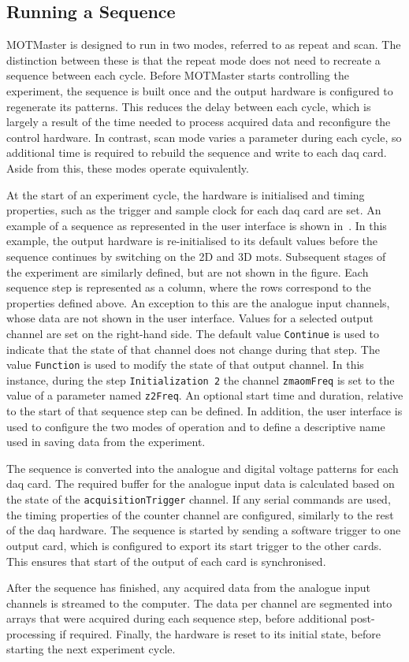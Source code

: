 \subsection{Running a Sequence}
MOTMaster is designed to run in two modes, referred to as repeat and scan.
The distinction between these is that the repeat mode does not need to
recreate a sequence between each cycle. Before MOTMaster starts controlling
the experiment, the sequence is built once and the output hardware is configured
to regenerate its patterns. This reduces the delay between
each cycle, which is largely a result of the time needed to process acquired
data and reconfigure the control hardware. In contrast, scan mode varies a
parameter during each cycle, so additional time is required to rebuild the
sequence and write to each \ac{daq} card. Aside from this, these modes
operate equivalently. \par\noindent
At the start of an experiment cycle, the hardware is
initialised and timing properties, such as the trigger and sample clock for
each \ac{daq} card are set. An example of a sequence as represented in
the user interface is shown in~. In
this example, the output hardware is re-initialised to its default
values before the sequence continues by switching on the 2D and 3D
\acp{mot}. Subsequent stages of
the experiment are similarly defined, but are not shown in the figure. Each sequence step is represented as a column, where the rows
correspond to the properties defined above. An exception to this are
the analogue input channels, whose data are not shown in the user
interface. Values for a selected output channel are set on the right-hand
side. The default value \verb|Continue| is used to indicate that the
state of that channel does not change during that step. The value
\verb|Function| is used to modify the state of that output channel. In
this instance, during the step \verb|Initialization 2| the channel \verb|zmaomFreq| is set to the value of a
parameter named \verb|z2Freq|. An optional start time and duration,
relative to the start of that sequence step can be defined. In addition, the user interface is used to configure
the two modes of operation and to define a descriptive
name used in saving data from the experiment.
\par\noindent 
The sequence is 
converted into the analogue and digital voltage patterns for each \ac{daq}
card. The required buffer for the analogue input
data is calculated based on the state of the \verb|acquisitionTrigger|
channel. If any serial commands are used, the timing properties of the
counter channel are configured, similarly to the rest of the \ac{daq}
hardware. The sequence is started by sending a software trigger to one output
card, which is configured to export its start trigger to the other cards.
This ensures that start of the output of each card is synchronised. 
\par\noindent
After the sequence has finished, any acquired data from the analogue input channels is
streamed to the computer. The data per channel are segmented into arrays that
were acquired during each sequence step, before additional post-processing if
required. Finally, the hardware is reset to its initial state, before
starting the next experiment cycle.

